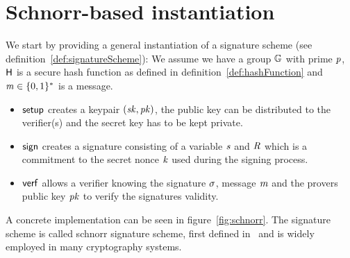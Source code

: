 \section{Schnorr-based instantiation}\label{sec:schnorrInst}

We start by providing a general instantiation of a signature scheme (see definition~\ref{def:signatureScheme}):
We assume we have a group $\mathbb{G}$ with prime $\mathit{p}$, $\mathsf{H}$ is a secure hash function as defined in definition~\ref{def:hashFunction} and $\mathit{m} \in \{0,1\}^{*}$ is a message.

\begin{itemize}
    \item $\mathsf{setup}$ creates a keypair $(\mathit{sk}, \mathit{pk})$, the public key can be distributed to the verifier(s) and the secret key has to be kept private. \\
    \item $\mathsf{sign}$ creates a signature consisting of a variable $\mathit{s}$ and $\mathit{R}$ which is a commitment to the secret nonce $\mathit{k}$ used during the signing process.
    \item $\mathsf{verf}$ allows a verifier knowing the signature $\sigma$, message $\mathit{m}$ and the provers public key $\mathit{pk}$ to verify the signatures validity. \\
\end{itemize}
A concrete implementation can be seen in figure~\ref{fig:schnorr}. The signature scheme is called schnorr signature scheme, first defined in~\cite{schnorr1989efficient} and is widely employed in many cryptography systems.
